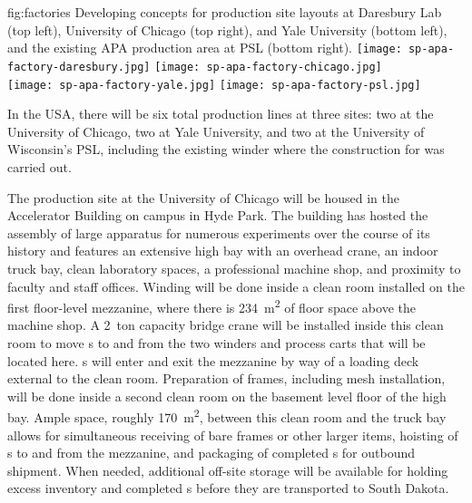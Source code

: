 \begin{dunefigure}{fig:factories}
{Developing concepts for production site layouts at Daresbury Lab (top left), University of Chicago (top right), and Yale University (bottom left), and the existing APA production area at PSL (bottom right).}
\texttt{[image: sp-apa-factory-daresbury.jpg]} 
\texttt{[image: sp-apa-factory-chicago.jpg]} \\
\vspace{1mm}
\texttt{[image: sp-apa-factory-yale.jpg]}
\texttt{[image: sp-apa-factory-psl.jpg]} 
\end{dunefigure}

In the USA, there will be six total production lines at three sites: two at the University of Chicago, two at Yale University, and two at the University of Wisconsin's PSL, including the existing winder where the construction for  was carried out. 

The  production site at the University of Chicago will be housed in the Accelerator Building on campus in Hyde Park.  The building has hosted the assembly of large apparatus for numerous experiments over the course of its history and features an extensive high bay with an overhead crane, an indoor truck bay, clean laboratory spaces, a professional machine shop, and proximity to faculty and staff offices.  Winding will be done inside a clean room installed on the first floor-level mezzanine, where there is \SI{234}{m^2} of floor space above the machine shop.  A \SI{2}{ton} capacity bridge crane will be installed inside this clean room to move s to and from the two winders and process carts that will be located here.  s will enter and exit the mezzanine by way of a loading deck external to the clean room.  Preparation of  frames, including mesh installation, will be done inside a second clean room on the basement level floor of the high bay.  Ample space, roughly \SI{170}{m^2}, between this clean room and the truck bay allows for simultaneous receiving of bare frames or other larger items, hoisting of s to and from the mezzanine, and packaging of completed s for outbound shipment.  When needed, additional off-site storage will be available for holding excess inventory and completed s before they are transported to South Dakota.

